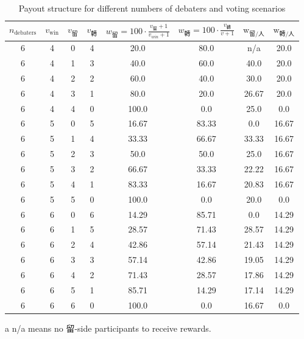 \documentclass[9pt]{article}
\begin{document}
\begin{table}[h]
    \centering
    \small
    \begin{threeparttable}
    \begin{tabular}{cccccccc}    
    \toprule
    $n_{\text{debaters}}$ & $v_{\text{win}}$ & $v_{\text{留}}$ & $v_{\text{轉}}$ & $w_{\text{留}} = 100 \cdot \frac{v_{\text{留}}+1}{v_{win}+1} $ & $w_{\text{轉}} = 100\cdot\frac{v_{\text{轉}}}{v+1}$ & $\text{w}_{\text{留}/\text{人} }$ & $\text{w}_{\text{轉}/\text{人}}$ \\
    \midrule

6 & 4 & 0 & 4 & 20.0 & 80.0 & n/a\tnote{a} & 20.0 \\
6 & 4 & 1 & 3 & 40.0 & 60.0 & 40.0 & 20.0 \\
6 & 4 & 2 & 2 & 60.0 & 40.0 & 30.0 & 20.0 \\
6 & 4 & 3 & 1 & 80.0 & 20.0 & 26.67 & 20.0 \\
6 & 4 & 4 & 0 & 100.0 & 0.0 & 25.0 & 0.0 \\
6 & 5 & 0 & 5 & 16.67 & 83.33 & 0.0 & 16.67 \\
6 & 5 & 1 & 4 & 33.33 & 66.67 & 33.33 & 16.67 \\
6 & 5 & 2 & 3 & 50.0 & 50.0 & 25.0 & 16.67 \\
6 & 5 & 3 & 2 & 66.67 & 33.33 & 22.22 & 16.67 \\
6 & 5 & 4 & 1 & 83.33 & 16.67 & 20.83 & 16.67 \\
6 & 5 & 5 & 0 & 100.0 & 0.0 & 20.0 & 0.0 \\
6 & 6 & 0 & 6 & 14.29 & 85.71 & 0.0 & 14.29 \\
6 & 6 & 1 & 5 & 28.57 & 71.43 & 28.57 & 14.29 \\
6 & 6 & 2 & 4 & 42.86 & 57.14 & 21.43 & 14.29 \\
6 & 6 & 3 & 3 & 57.14 & 42.86 & 19.05 & 14.29 \\
6 & 6 & 4 & 2 & 71.43 & 28.57 & 17.86 & 14.29 \\
6 & 6 & 5 & 1 & 85.71 & 14.29 & 17.14 & 14.29 \\
6 & 6 & 6 & 0 & 100.0 & 0.0 & 16.67 & 0.0 \\
\bottomrule
\end{tabular}
\begin{tablenotes}
    \item[a] n/a means no 留-side participants to receive rewards.
\end{tablenotes}
\end{threeparttable}

\caption{Payout structure for different numbers of debaters and voting scenarios}
\end{table}
\end{document}
